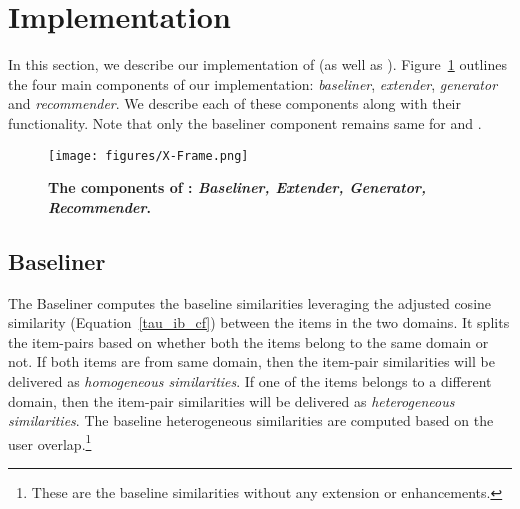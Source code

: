 \vspace{-2mm}
\section{Implementation}
\label{Implementation}
In this section, we describe our implementation of \crossrec (as well as \npcrossrec). Figure~\ref{fig:XMap_Arch} outlines the four main components of our implementation: \emph{baseliner}, \emph{extender}, \emph{generator} and \emph{recommender}. We describe each of these components along with their functionality. Note that only the baseliner component remains same for \crossrec and \npcrossrec.

\begin{figure}
\begin{center}
\texttt{[image: figures/X-Frame.png]}
\caption{{\bf The components of \crossrec: \emph{Baseliner, Extender, Generator, Recommender}.}}
\vspace{-3mm}
\label{fig:XMap_Arch}
\end{center}
\end{figure}


\subsection{Baseliner}
The Baseliner computes the baseline similarities leveraging the adjusted cosine similarity (Equation~\ref{tau_ib_cf}) between the items in the two domains. It splits the item-pairs based on whether both the items belong to the same domain or not. If both items are from same domain, then the item-pair similarities will be delivered as \emph{homogeneous similarities}. If one of the items belongs to a different domain, then the item-pair similarities will be delivered as \emph{heterogeneous similarities}. The baseline heterogeneous similarities are computed based on the user overlap.\footnote{These are the baseline similarities without any extension or enhancements.}

